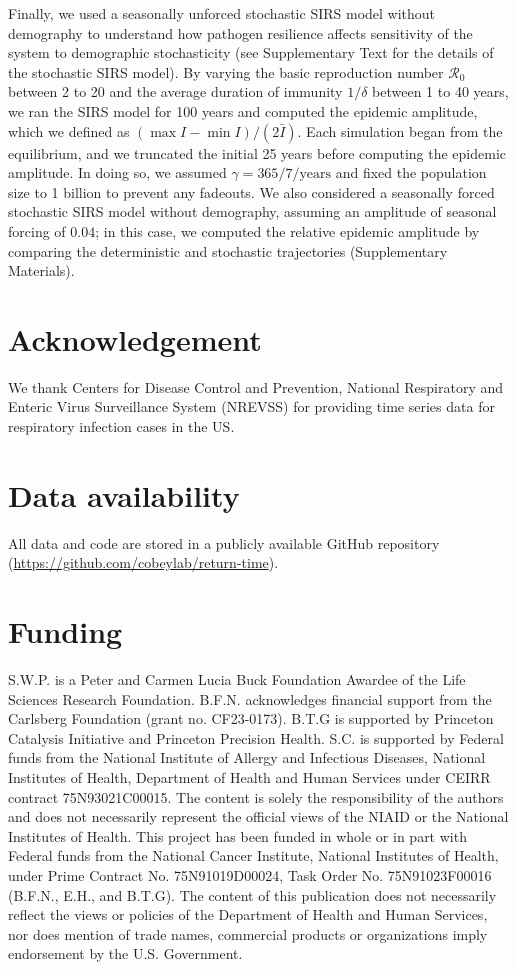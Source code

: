 \documentclass[12pt]{article}
\begin{document}
Finally, we used a seasonally unforced stochastic SIRS model without demography to understand how pathogen resilience affects sensitivity of the system to demographic stochasticity (see Supplementary Text for the details of the stochastic SIRS model).
By varying the basic reproduction number $\mathcal R_0$ between 2 to 20 and the average duration of immunity $1/\delta$ between 1 to 40 years, we ran the SIRS model for 100 years and computed the epidemic amplitude, which we defined as  $(\max I - \min I)/(2 \bar{I})$.
Each simulation began from the equilibrium, and we truncated the initial 25 years before computing the epidemic amplitude.
In doing so, we assumed $\gamma=365/7/\mathrm{years}$ and fixed the population size to 1 billion to prevent any fadeouts.
We also considered a seasonally forced stochastic SIRS model without demography, assuming an amplitude of seasonal forcing of $0.04$;
in this case, we computed the relative epidemic amplitude by comparing the deterministic and stochastic trajectories (Supplementary Materials).

\section*{Acknowledgement}

We thank Centers for Disease Control and Prevention, National Respiratory and Enteric Virus Surveillance System (NREVSS) for providing time series data for respiratory infection cases in the US.

\section*{Data availability}

All data and code are stored in a publicly available GitHub repository (\url{https://github.com/cobeylab/return-time}).

\section*{Funding}

S.W.P. is a Peter and Carmen Lucia Buck Foundation Awardee of the Life Sciences Research Foundation. 
B.F.N. acknowledges financial support from the Carlsberg Foundation (grant no. CF23-0173).
B.T.G is supported by Princeton Catalysis Initiative and Princeton Precision Health.
S.C. is supported by Federal funds from the National Institute of Allergy and Infectious Diseases, National Institutes of Health, Department of Health and Human Services under CEIRR contract 75N93021C00015.
The content is solely the responsibility of the authors and does not necessarily represent the official views of the NIAID or the National Institutes of Health. 
This project has been funded in whole or in part with Federal funds from the National Cancer Institute, National Institutes of Health, under Prime Contract No. 75N91019D00024, Task Order No. 75N91023F00016 (B.F.N., E.H., and B.T.G). 
The content of this publication does not necessarily reflect the views or policies of the Department of Health and Human Services, nor does mention of trade names, commercial products or organizations imply endorsement by the U.S. Government.
\end{document}
